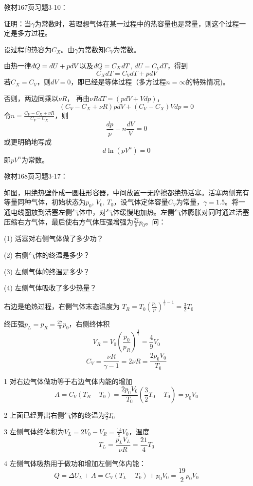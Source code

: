 \documentclass[CJK]{beamer}
\begin{document}
\begin{frame}
  \chtitle{\proid (\stwo)}
  \bch
  教材167页习题3-10：

  证明：当$\gamma$为常数时，若理想气体在某一过程中的热容量也是常量，则这个过程一定是多方过程。
  \ech
\end{frame}


\begin{frame}
  \bch
  {\small
  设过程的热容为$C_X$。由$\gamma$为常数知$C_V$为常数。

  由热一律$\dbar Q = dU + pdV$以及$\dbar Q = C_X dT$, $dU = C_V dT$，得到
  $$ C_X dT = C_V dT + p dV$$
  若$C_X = C_V$，则$dV = 0$，即已经是等体过程（多方过程$n=\infty$的特殊情况)。
    
    否则，两边同乘以$\nu R$， 再由$\nu R dT =  (pdV + Vdp) $，
  $$ (C_V-C_X + \nu R) pdV + (C_V-C_X) Vdp = 0$$
  令$n =\frac{C_V-C_X + \nu R}{C_V-C_X }$，则
  $$ \frac{dp}{p} + n\frac{dV}{V} = 0$$
  或更明确地写成
  $$ d \ln (pV^n) = 0$$
  即$pV^n$为常数。
  }
  \ech
\end{frame}

\begin{frame}
  \chtitle{\proid (\stwo)}
  \bch
  教材168页习题3-17：
  
  如图，用绝热壁作成一圆柱形容器，中间放置一无摩擦都绝热活塞。活塞两侧充有等量同种气体，初始状态为$p_0$, $V_0$, $T_0$，设气体定体容量$C_V$为常量，$\gamma = 1.5$。将一通电线圈放到活塞左侧气体中，对气体缓慢地加热。左侧气体膨胀对同时通过活塞压缩右方气体，最后使右方气体压强增强为$\frac{27}{8}p_0$。问：
  \bitem
\item[(1)]{活塞对右侧气体做了多少功？}
\item[(2)]{右侧气体的终温是多少？}
\item[(3)]{左侧气体的终温是多少？}
\item[(4)]{左侧气体吸收了多少热量？}  
  \eitem
  \emini
  \emini
  \ech
\end{frame}

\begin{frame}
  \bch
  {\scriptsize
    右边是绝热过程，右侧气体末态温度为
    $T_R = T_0\left(\frac{p_0}{p}\right)^{\frac{1}{\gamma}-1} = \frac{3}{2}T_0$
    
    终压强$p_L=p_R=\frac{27}{8}p_0$，右侧终体积
    $$V_R = V_0\left(\frac{p_0}{p_R}\right)^{\frac{1}{\gamma}} = \frac{4}{9}V_0$$
    $$C_V = \frac{\nu R}{\gamma - 1} = 2 \nu R = \frac{2p_0V_0}{T_0}$$
  
    \bitem
  \item[1]{对右边气体做功等于右边气体内能的增加
    $$A = C_V(T_R-T_0) = \frac{2p_0V_0}{T_0}\left(\frac{3}{2}T_0-T_0\right) = p_0V_0$$}
  \item[2]{上面已经算出右侧气体的终温为$\frac{3}{2}T_0$}
  \item[3]{左侧气体终体积为$V_L=2V_0-V_R = \frac{14}{9}V_0$，温度
    $$T_L = \frac{p_LV_L}{\nu R} = \frac{21}{4}T_0$$}
  \item[4]{左侧气体吸热用于做功和增加左侧气体内能：
    $$ Q = \Delta U_L + A = C_V(T_L-T_0) + p_0V_0 = \frac{19}{2}p_0V_0$$}
    \eitem
  }
  \ech
\end{frame}
\end{document}
